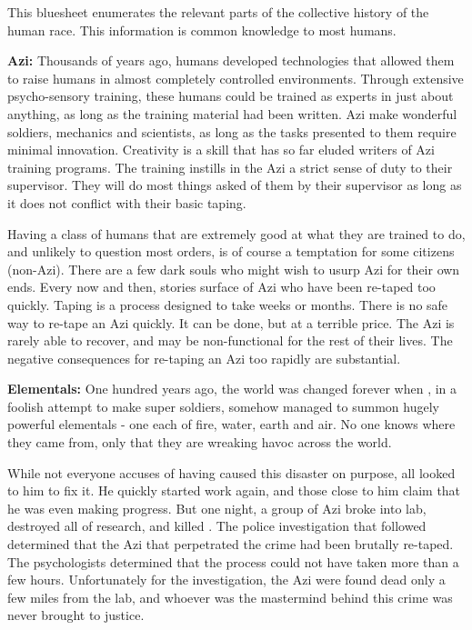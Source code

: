 \documentclass[blue]{elementals}
\begin{document}
\name{\bTest{}}

This bluesheet enumerates the relevant parts of the collective history of the human race. This information is common knowledge to most humans.

{\bf Azi:} %
Thousands of years ago, humans developed technologies that allowed them to raise humans in almost completely controlled environments. Through extensive psycho-sensory training, these humans could be trained as experts in just about anything, as long as the training material had been written. Azi make wonderful soldiers, mechanics and scientists, as long as the tasks presented to them require minimal innovation. Creativity is a skill that has so far eluded writers of Azi training programs. The training instills in the Azi a strict sense of duty to their supervisor. They will do most things asked of them by their supervisor as long as it does not conflict with their basic taping.

Having a class of humans that are extremely good at what they are trained to do, and unlikely to question most orders, is of course a temptation for some citizens (non-Azi). There are a few dark souls who might wish to usurp Azi for their own ends. Every now and then, stories surface of Azi who have been re-taped too quickly.  Taping is a process designed to take weeks or months. There is no safe way to re-tape an Azi quickly. It can be done, but at a terrible price. The Azi is rarely able to recover, and may be non-functional for the rest of their lives.  The negative consequences for re-taping an Azi too rapidly are substantial. %

{\bf Elementals:}
One hundred years ago, the world was changed forever when \cGrandfather{}, in a foolish attempt to make super soldiers, somehow managed to summon hugely powerful elementals - one each of fire, water, earth and air. No one knows where they came from, only that they are wreaking havoc across the world. 

While not everyone accuses \cGrandfather{} of having caused this disaster on purpose, all looked to him to fix it. He quickly started work again, and those close to him claim that he was even making progress. But one night, a group of Azi broke into \cGrandfather{\their} lab, destroyed all of \cGrandfather{\their} research, and killed \cGrandfather{\them}. The police investigation that followed determined that the Azi that perpetrated the crime had been brutally re-taped. The psychologists determined that the process could not have taken more than a few hours. Unfortunately for the investigation, the Azi were found dead only a few miles from the lab, and whoever was the mastermind behind this crime was never brought to justice.
\end{document}
